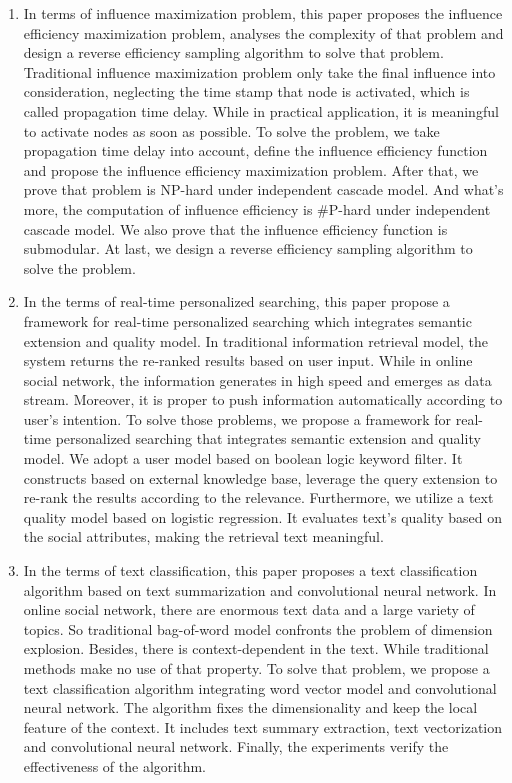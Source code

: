\begin{eabstract}
\begin{enumerate}
	\item In terms of influence maximization problem, this paper proposes the influence efficiency maximization problem, analyses the complexity of that problem and design a reverse efficiency sampling algorithm to solve that problem. Traditional influence maximization problem only take the final influence into consideration, neglecting the time stamp that node is activated, which is called propagation time delay. While in practical application, it is meaningful to activate nodes as soon as possible. To solve the problem, we take propagation time delay into account, define the influence efficiency function and propose the influence efficiency maximization problem. After that, we prove that problem is NP-hard under independent cascade model. And what's more, the computation of influence efficiency is \#P-hard under independent cascade model. We also prove that the influence efficiency function is submodular. At last, we design a reverse efficiency sampling algorithm to solve the problem.
	\item In the terms of real-time personalized searching, this paper propose a framework for real-time personalized searching which integrates semantic extension and quality model. In traditional information retrieval model, the system returns the re-ranked results based on user input. While in online social network, the information generates in high speed and emerges as data stream. Moreover, it is proper to push information automatically according to user's intention. To solve those problems, we propose a framework for real-time personalized searching that integrates semantic extension and quality model. We adopt a user model based on boolean logic keyword filter. It constructs based on external knowledge base, leverage the query extension to re-rank the results according to the relevance. Furthermore, we utilize a text quality model based on logistic regression. It evaluates text's quality based on the social attributes, making the retrieval text meaningful.
	\item In the terms of text classification, this paper proposes a text classification algorithm based on text summarization and convolutional neural network. In online social network, there are enormous text data and a large variety of topics. So traditional bag-of-word model confronts the problem of dimension explosion. Besides, there is context-dependent in the text. While traditional methods make no use of that property. To solve that problem, we propose a text classification algorithm integrating word vector model and convolutional neural network. The algorithm fixes the dimensionality and keep the local feature of the context. It includes text summary extraction, text vectorization and convolutional neural network. Finally, the experiments verify the effectiveness of the algorithm.

\end{enumerate}
\end{eabstract}
